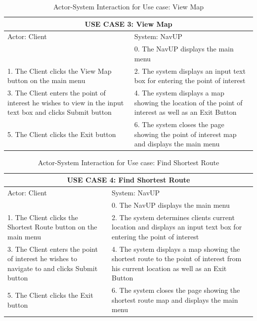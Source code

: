 \documentclass[a4paper,10pt]{article}
\begin{document}
\begin{enumerate}
\begin{table}[h!]
\centering
\begin {tabular}{ |p{6cm}||p{6cm}|}
\hline
\multicolumn{2}{|c|}{USE CASE 3: View Map }\\
\hline
Actor: Client&System: NavUP\\
\hline
&0. The NavUP displays the main menu\\
1. The Client clicks the View Map button on the main menu &2. The system displays an input text box for entering the point of interest\\
3. The Client enters the point of interest  he wishes to view in the input text box and clicks Submit button &4. The system displays a map showing the location of the point of interest as well as an Exit Button\\
5. The Client clicks the Exit button &6. The system closes the page showing the point of interest map and displays the main menu\\
\hline
\end {tabular}
\caption{Actor-System Interaction for Use case: View Map} 
\end {table}
 
 
\begin{table}[h!]
\centering
\begin {tabular}{ |p{6cm}||p{6cm}|}
\hline
\multicolumn{2}{|c|}{USE CASE 4: Find Shortest Route }\\
\hline
Actor: Client&System: NavUP\\
\hline
&0. The NavUP displays the main menu\\
1. The Client clicks the Shortest Route button on the main menu &2. The system determines clients current location and displays an input text box for entering the point of interest\\
3. The Client enters the point of interest he wishes to navigate to and clicks Submit button &4. The system displays a map showing the shortest route to the point of interest from his current location as well as an Exit Button\\
5. The Client clicks the Exit button &6. The system closes the page showing the shortest route map and displays the main menu\\
\hline
\end {tabular}
\caption{Actor-System Interaction for Use case:  Find Shortest Route} 
\end {table}


\end{enumerate}
\end{document}
